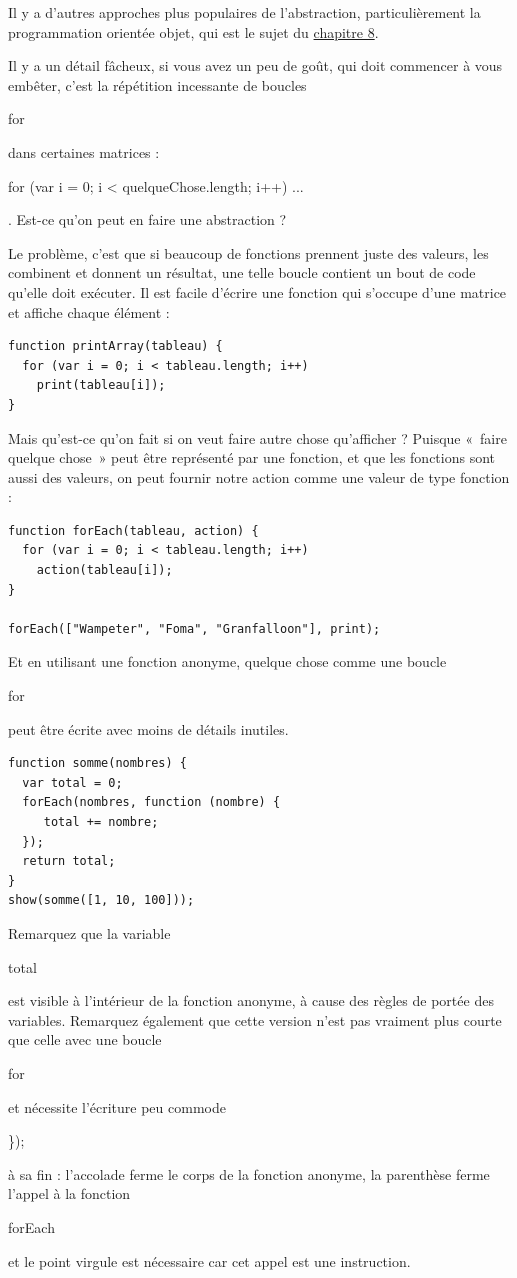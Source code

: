 \documentclass{FramateX}
\renewcommand{\texttt}[1]{\begin{sffamily}{#1}\end{sffamily}}
\begin{document}
Il y a d'autres approches plus populaires de l'abstraction,
particulièrement la programmation orientée objet, qui est le sujet du
\href{chapter8.html}{chapitre 8}.

Il y a un détail fâcheux, si vous avez un peu de goût, qui doit
commencer à vous embêter, c'est la répétition incessante de boucles
\texttt{for} dans certaines matrices :
\texttt{for (var i = 0; i \textless{} quelqueChose.length; i++) ...}.
Est-ce qu'on peut en faire une abstraction ?

Le problème, c'est que si beaucoup de fonctions prennent juste des
valeurs, les combinent et donnent un résultat, une telle boucle contient
un bout de code qu'elle doit exécuter. Il est facile d'écrire une
fonction qui s'occupe d'une matrice et affiche chaque élément :

\begin{lstlisting}
function printArray(tableau) {
  for (var i = 0; i < tableau.length; i++)
    print(tableau[i]);
}
\end{lstlisting}
Mais qu'est-ce qu'on fait si on veut faire autre chose qu'afficher ?
Puisque «~faire quelque chose~» peut être représenté par une fonction,
et que les fonctions sont aussi des valeurs, on peut fournir notre
action comme une valeur de type fonction :

\begin{lstlisting}
function forEach(tableau, action) {
  for (var i = 0; i < tableau.length; i++)
    action(tableau[i]);
}

forEach(["Wampeter", "Foma", "Granfalloon"], print);
\end{lstlisting}
Et en utilisant une fonction anonyme, quelque chose comme une boucle
\texttt{for} peut être écrite avec moins de détails inutiles.

\begin{lstlisting}
function somme(nombres) {
  var total = 0;
  forEach(nombres, function (nombre) {
     total += nombre;
  });
  return total;
}
show(somme([1, 10, 100]));
\end{lstlisting}
Remarquez que la variable \texttt{total} est visible à l'intérieur de la
fonction anonyme, à cause des règles de portée des variables. Remarquez
également que cette version n'est pas vraiment plus courte que celle
avec une boucle \texttt{for} et nécessite l'écriture peu commode
\texttt{\});} à sa fin : l'accolade ferme le corps de la fonction
anonyme, la parenthèse ferme l'appel à la fonction \texttt{forEach} et
le point virgule est nécessaire car cet appel est une instruction.
\end{document}
